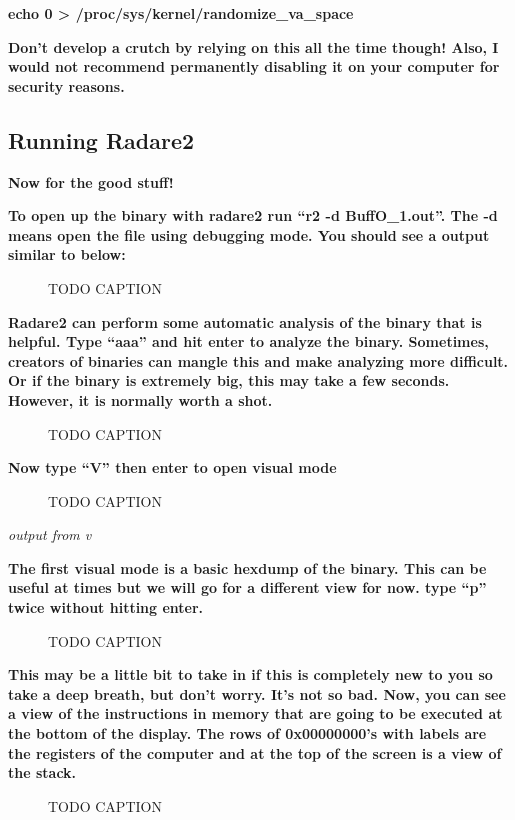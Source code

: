 \documentclass[letterpaper]{article}
\newcommand{\sitfig}[3]{
\begin{figure}[H]
\centering
\makebox[\textwidth][c]{
#2
}
\caption{#3}
\label{#1}
\end{figure}
}
\newcommand{\sitgfx}[4][scale=1.0]{
\sitfig{#3}{\texttt{[image: \#2]}}{#4}
}
\begin{document}
\textbf{echo 0 {\textgreater} /proc/sys/kernel/randomize\_va\_space}

\textbf{Don't develop a crutch by relying on this all the time though! Also, I would not recommend permanently disabling
it on your computer for security reasons.}

\subsection{Running Radare2}

\textbf{Now for the good stuff!}

\textbf{To open up the binary with radare2 run ``r2 -d BuffO\_1.out''. The -d means open the file using debugging mode.
You should see a output similar to below:}

  
\sitgfx[width=5.8335in,height=3.6457in]{FINALWORKINGDOCFORMERLYPRECURSOR-img084.png}{fig:unk}{TODO CAPTION}
 

\textbf{Radare2 can perform some automatic analysis of the binary that is helpful. Type ``aaa'' and hit enter to analyze
the binary. Sometimes, creators of binaries can mangle this and make analyzing more difficult. Or if the binary is
extremely big, this may take a few seconds. However, it is normally worth a shot.}

  
\sitgfx[width=5.8335in,height=3.6457in]{FINALWORKINGDOCFORMERLYPRECURSOR-img075.png}{fig:unk}{TODO CAPTION}
 

\textbf{Now type ``V'' then enter to open visual mode}

  
\sitgfx[width=5.8335in,height=3.6457in]{FINALWORKINGDOCFORMERLYPRECURSOR-img076.png}{fig:unk}{TODO CAPTION}
 

\textit{output from v}

\textbf{The first visual mode is a basic hexdump of the binary. This can be useful at times but we will go for a
different view for now. type ``p'' twice without hitting enter.}

  
\sitgfx[width=5.8335in,height=3.6457in]{FINALWORKINGDOCFORMERLYPRECURSOR-img077.png}{fig:unk}{TODO CAPTION}
 

\textbf{This may be a little bit to take in if this is completely new to you so take a deep breath, but don't worry.
It's not so bad. Now, you can see a view of the instructions in memory that are going to be executed at the bottom of
the display. The rows of 0x00000000's with labels are the registers of the computer and at the top of the screen is a
view of the stack.}

  
\sitgfx[width=5.8335in,height=3.6457in]{FINALWORKINGDOCFORMERLYPRECURSOR-img027.png}{fig:unk}{TODO CAPTION}
 
\end{document}
